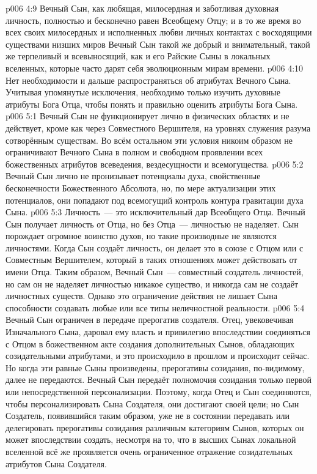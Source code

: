 \vs p006 4:9 \pc Вечный Сын, как любящая, милосердная и заботливая духовная личность, полностью и бесконечно равен Всеобщему Отцу; и в то же время во всех своих милосердных и исполненных любви личных контактах с восходящими существами низших миров Вечный Сын такой же добрый и внимательный, такой же терпеливый и всевыносящий, как и его Райские Сыны в локальных вселенных, которые часто дарят себя эволюционным мирам времени.
\vs p006 4:10 Нет необходимости и дальше распространяться об атрибутах Вечного Сына. Учитывая упомянутые исключения, необходимо только изучить духовные атрибуты Бога Отца, чтобы понять и правильно оценить атрибуты Бога Сына.
\vs p006 5:1 Вечный Сын не функционирует лично в физических областях и не действует, кроме как через Совместного Вершителя, на уровнях служения разума сотворённым существам. Во всём остальном эти условия никоим образом не ограничивают Вечного Сына в полном и свободном проявлении всех божественных атрибутов  всеведения, вездесущности и всемогущества.
\vs p006 5:2 Вечный Сын лично не пронизывает потенциалы духа, свойственные бесконечности Божественного Абсолюта, но, по мере актуализации этих потенциалов, они попадают под всемогущий контроль контура гравитации духа Сына.
\vs p006 5:3 Личность~--- это исключительный дар Всеобщего Отца. Вечный Сын получает личность от Отца, но без Отца~--- личностью не наделяет. Сын порождает огромное воинство духов, но такие производные не являются личностями. Когда Сын создаёт личность, он делает это в союзе с Отцом или с Совместным Вершителем, который в таких отношениях может действовать от имени Отца. Таким образом, Вечный Сын~--- совместный создатель личностей, но сам он не наделяет личностью никакое существо, и никогда сам не создаёт личностных существ. Однако это ограничение действия не лишает Сына способности создавать любые или все типы неличностной реальности.
\vs p006 5:4 Вечный Сын ограничен в передаче прерогатив создателя. Отец, увековечивая Изначального Сына, даровал ему власть и привилегию впоследствии соединяться с Отцом в божественном акте создания дополнительных Сынов, обладающих созидательными атрибутами, и это происходило в прошлом и происходит сейчас. Но когда эти равные Сыны произведены, прерогативы созидания, по\hyp{}видимому, далее не передаются. Вечный Сын передаёт полномочия созидания только первой или непосредственной персонализации. Поэтому, когда Отец и Сын соединяются, чтобы персонализировать Сына Создателя, они достигают своей цели; но Сын Создатель, появившийся таким образом, уже не в состоянии передавать или делегировать прерогативы созидания различным категориям Сынов, которых он может впоследствии создать, несмотря на то, что в высших Сынах локальной вселенной всё же проявляется очень ограниченное отражение созидательных атрибутов Сына Создателя.
